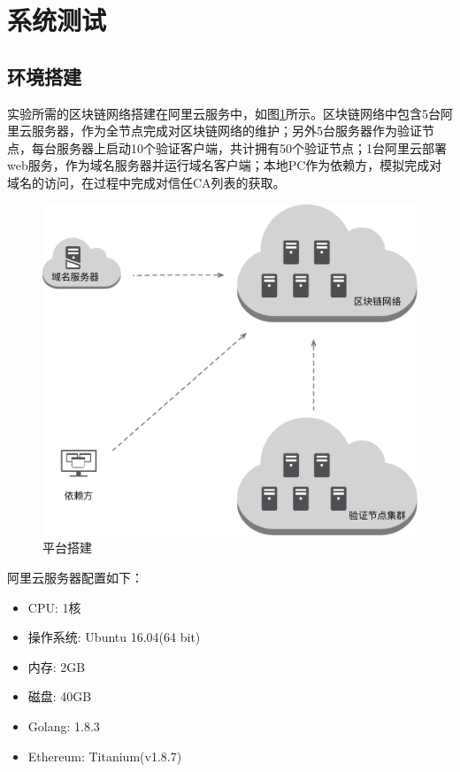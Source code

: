\section{系统测试}


\subsection{环境搭建}



实验所需的区块链网络搭建在阿里云服务中，如图\ref{fig:platform}所示。区块链网络中包含5台阿里云服务器，作为全节点完成对区块链网络的维护；另外5台服务器作为验证节点，每台服务器上启动10个验证客户端，共计拥有50个验证节点；1台阿里云部署web服务，作为域名服务器并运行域名客户端；本地PC作为依赖方，模拟完成对域名的访问，在过程中完成对信任CA列表的获取。

\begin{figure}[!htbp]
 	\centering
 	\includegraphics[scale = 0.4]{img/platform}
 	\caption{平台搭建}\label{fig:platform}
\end{figure}

阿里云服务器配置如下：

\begin{itemize}
	\item CPU: 1核
	\item 操作系统: Ubuntu 16.04(64 bit)
	\item 内存: 2GB
	\item 磁盘: 40GB
	\item Golang: 1.8.3
	\item Ethereum: Titanium(v1.8.7)
\end{itemize}

